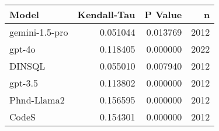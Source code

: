 \begin{tabular}{lrrr}
\toprule
Model & Kendall-Tau & P Value & n \\
\midrule
gemini-1.5-pro & 0.051044 & 0.013769 & 2012 \\
gpt-4o & 0.118405 & 0.000000 & 2022 \\
DINSQL & 0.055010 & 0.007940 & 2012 \\
gpt-3.5 & 0.113802 & 0.000000 & 2012 \\
Phnd-Llama2 & 0.156595 & 0.000000 & 2012 \\
CodeS & 0.154301 & 0.000000 & 2012 \\
\bottomrule
\end{tabular}
